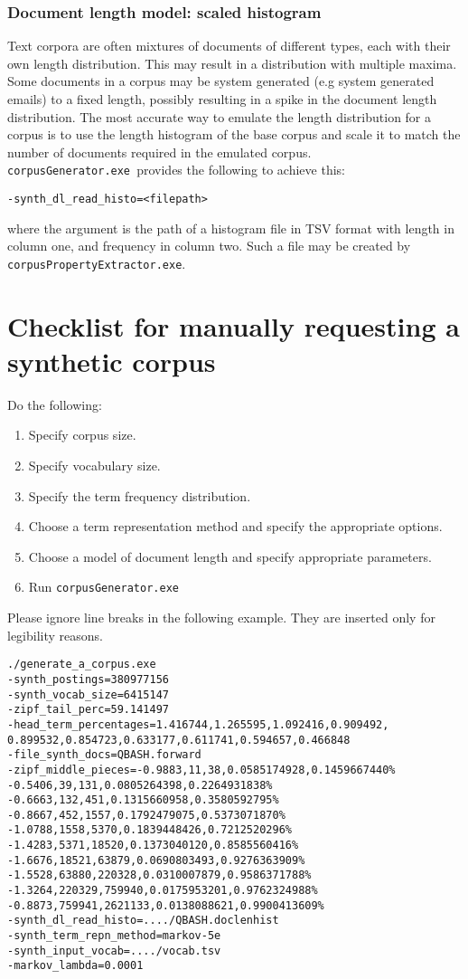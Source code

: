 \documentclass{article}
\newcommand{\gac}{\texttt{corpusGenerator.exe~}}
\begin{document}
\subsubsection{Document length model: scaled histogram}
Text corpora are often mixtures of documents of different types, each
with their own length distribution. This may result in a distribution
with multiple maxima.  Some documents in a corpus may be
system generated (e.g system generated emails) to a fixed length, possibly
resulting in a spike in the document length distribution.  The most
accurate way to emulate the length distribution for a corpus is to use
the length histogram of the base corpus and scale it to match the
number of documents required in the emulated corpus.  \gac provides
the following to achieve this:
\begin{verbatim}
-synth_dl_read_histo=<filepath>
\end{verbatim}
where the argument is the path of a histogram file in TSV format with
length in column one, and frequency in column two.  Such a file may be
created by \verb|corpusPropertyExtractor.exe|.

\section{Checklist for manually requesting a synthetic corpus}

Do the following:
\begin{enumerate}
\item Specify corpus size.
\item Specify vocabulary size.
\item Specify the term frequency distribution.
\item Choose a term representation method and specify the
  appropriate options.
\item Choose a model of document length and specify appropriate
  parameters.
\item Run \gac
\end{enumerate}

Please ignore line breaks in the following example.  They are inserted
only for legibility reasons.

\begin{verbatim}
./generate_a_corpus.exe 
-synth_postings=380977156
-synth_vocab_size=6415147 
-zipf_tail_perc=59.141497 
-head_term_percentages=1.416744,1.265595,1.092416,0.909492,
0.899532,0.854723,0.633177,0.611741,0.594657,0.466848 
-file_synth_docs=QBASH.forward 
-zipf_middle_pieces=-0.9883,11,38,0.0585174928,0.1459667440%
-0.5406,39,131,0.0805264398,0.2264931838%
-0.6663,132,451,0.1315660958,0.3580592795%
-0.8667,452,1557,0.1792479075,0.5373071870%
-1.0788,1558,5370,0.1839448426,0.7212520296%
-1.4283,5371,18520,0.1373040120,0.8585560416%
-1.6676,18521,63879,0.0690803493,0.9276363909%
-1.5528,63880,220328,0.0310007879,0.9586371788%
-1.3264,220329,759940,0.0175953201,0.9762324988%
-0.8873,759941,2621133,0.0138088621,0.9900413609% 
-synth_dl_read_histo=..../QBASH.doclenhist 
-synth_term_repn_method=markov-5e 
-synth_input_vocab=..../vocab.tsv 
-markov_lambda=0.0001
\end{verbatim}
\end{document}
